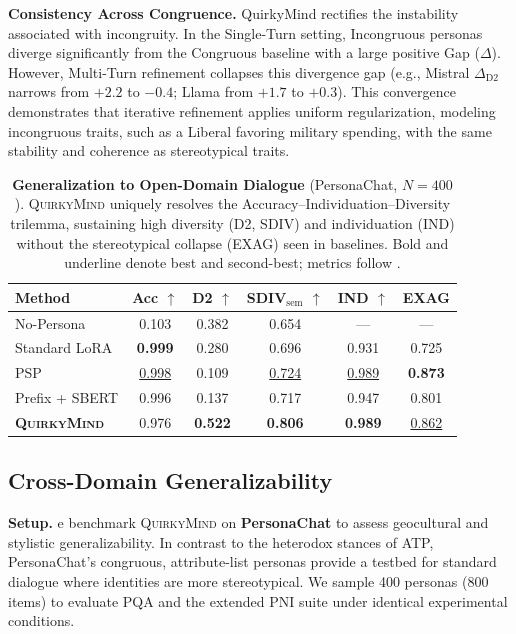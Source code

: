 \noindent \textbf{Consistency Across Congruence.}
QuirkyMind rectifies the instability associated with incongruity. In the Single-Turn setting, Incongruous personas diverge significantly from the Congruous baseline with a large positive \colorbox{stable}{Gap ($\Delta$)}. However, Multi-Turn refinement collapses this divergence gap (e.g., Mistral $\Delta_{\text{D2}}$ narrows from $+2.2$ to $-0.4$; Llama from $+1.7$ to $+0.3$). This convergence demonstrates that iterative refinement applies uniform regularization, modeling incongruous traits, such as a Liberal favoring military spending, with the same stability and coherence as stereotypical traits.



\begin{table}[t]
\centering
\small
\setlength{\tabcolsep}{0pt} %
\begin{tabular*}{\columnwidth}{@{\extracolsep{\fill}} l ccccc}
\toprule
\textbf{Method} & \textbf{Acc} $\uparrow$ & \textbf{D2} $\uparrow$ & \textbf{SDIV}$_{\text{sem}}$ $\uparrow$ & \textbf{IND} $\uparrow$ & \textbf{EXAG} \\
\midrule
No-Persona        & 0.103 & 0.382 & 0.654 & --- & --- \\
Standard LoRA     & \textbf{0.999} & 0.280 & 0.696 & 0.931 & 0.725 \\
PSP               & \underline{0.998} & 0.109 & \underline{0.724} & \underline{0.989} & \textbf{0.873} \\
Prefix + SBERT    & 0.996 & 0.137 & 0.717 & 0.947 & 0.801 \\
\midrule
\textbf{\textsc{QuirkyMind}} & 0.976 & \textbf{0.522} & \textbf{0.806} & \textbf{0.989} & \underline{0.862} \\
\bottomrule
\end{tabular*}
\caption{\textbf{Generalization to Open-Domain Dialogue} (PersonaChat, $N=400$). \textsc{QuirkyMind} uniquely resolves the Accuracy--Individuation--Diversity trilemma, sustaining high diversity (D2, SDIV) and individuation (IND) without the stereotypical collapse (EXAG) seen in baselines. Bold and underline denote best and second-best; metrics follow \citet{liu2024incongruous}.}
\label{tab:baselines}
\end{table}


\subsection{Cross-Domain Generalizability}\label{sec:rq5}
\noindent\textbf{Setup.}
e benchmark \textsc{QuirkyMind} on \textbf{PersonaChat} \citep{zhang2018personachat} to assess geocultural and stylistic generalizability. In contrast to the heterodox stances of ATP, PersonaChat’s congruous, attribute-list personas provide a testbed for standard dialogue where identities are more stereotypical. We sample 400 personas (800 items) to evaluate PQA and the extended PNI suite under identical experimental conditions.

